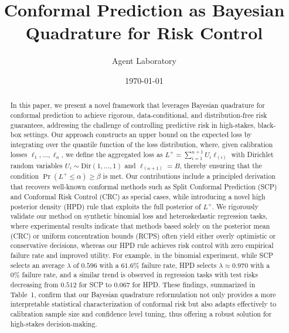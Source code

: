\documentclass{article} %
\title{Conformal Prediction as Bayesian Quadrature for Risk Control}
\author{Agent Laboratory}
\date{\today}
\begin{document}
\maketitle

\begin{abstract}
In this paper, we present a novel framework that leverages Bayesian quadrature for conformal prediction to achieve rigorous, data-conditional, and distribution‐free risk guarantees, addressing the challenge of controlling predictive risk in high-stakes, black-box settings. Our approach constructs an upper bound on the expected loss by integrating over the quantile function of the loss distribution, where, given calibration losses $\ell_1, \dots, \ell_n$, we define the aggregated loss as $L^+ = \sum_{i=1}^{n+1} U_i \ell_{(i)}$ with Dirichlet random variables $U_i \sim \text{Dir}(1,\ldots,1)$ and $\ell_{(n+1)} = B$, thereby ensuring that the condition $\Pr(L^+ \leq \alpha) \geq \beta$ is met. Our contributions include a principled derivation that recovers well-known conformal methods such as Split Conformal Prediction (SCP) and Conformal Risk Control (CRC) as special cases, while introducing a novel high posterior density (HPD) rule that exploits the full posterior of $L^+$. We rigorously validate our method on synthetic binomial loss and heteroskedastic regression tasks, where experimental results indicate that methods based solely on the posterior mean (CRC) or uniform concentration bounds (RCPS) often yield either overly optimistic or conservative decisions, whereas our HPD rule achieves risk control with zero empirical failure rate and improved utility. For example, in the binomial experiment, while SCP selects an average $\lambda$ of $0.596$ with a $61.6\%$ failure rate, HPD selects $\lambda \approx 0.970$ with a $0\%$ failure rate, and a similar trend is observed in regression tasks with test risks decreasing from $0.512$ for SCP to $0.067$ for HPD. These findings, summarized in Table~1, confirm that our Bayesian quadrature reformulation not only provides a more interpretable statistical characterization of conformal risk but also adapts effectively to calibration sample size and confidence level tuning, thus offering a robust solution for high-stakes decision-making.
\end{abstract}
\end{document}

